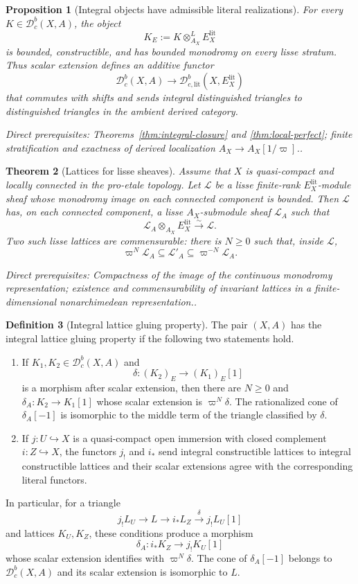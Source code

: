 \documentclass[10pt]{article}
\newtheorem{theorem}{Theorem}[section]
\newtheorem{proposition}[theorem]{Proposition}
\theoremstyle{definition}
\newtheorem{definition}[theorem]{Definition}
\newcommand{\Dbc}{\mathcal D^b_c}
\newcommand{\Dbclit}{\mathcal D^b_{c,\mathrm{lit}}}
\newcommand{\depends}[1]{\par\smallskip\noindent\textit{Direct prerequisites:} #1.}
\begin{document}
\begin{proposition}[Integral objects have admissible literal realizations]
\label{prop:integral-literal-landing}
For every $K\in\Dbc(X,A)$, the object
\[
 K_E:=K\otimes^L_{A_X}E_X^{\mathrm{lit}}
\]
is bounded, constructible, and has bounded monodromy on every lisse
stratum.  Thus scalar extension defines an additive functor
\[
 \Dbc(X,A)\longrightarrow\Dbclit(X,E_X^{\mathrm{lit}})
\]
that commutes with shifts and sends integral distinguished triangles to
distinguished triangles in the ambient derived category.
\depends{Theorems~\ref{thm:integral-closure} and
\ref{thm:local-perfect}; finite stratification and exactness of derived
localization $A_X\to A_X[1/\varpi]$.}
\end{proposition}

\begin{theorem}[Lattices for lisse sheaves]\label{thm:lisse-lattice}
Assume that $X$ is quasi-compact and locally connected in the pro-etale
topology.  Let $\mathcal L$ be a lisse finite-rank
$E_X^{\mathrm{lit}}$-module sheaf whose monodromy image on each connected
component is bounded.  Then $\mathcal L$ has, on each connected component, a lisse
$A_X$-submodule sheaf $\mathcal L_A$ such that
\[
 \mathcal L_A\otimes_{A_X}E_X^{\mathrm{lit}}
 \xrightarrow{\sim}\mathcal L.
\]
Two such lisse lattices are commensurable: there is $N\geq0$ such that,
inside $\mathcal L$,
\[
 \varpi^N\mathcal L_A\subseteq\mathcal L'_A
 \subseteq\varpi^{-N}\mathcal L_A.
\]
\depends{Compactness of the image of the continuous monodromy
representation; existence and commensurability of invariant lattices in a
finite-dimensional nonarchimedean representation.}
\end{theorem}

\begin{definition}[Integral lattice gluing property]
\label{def:lattice-gluing}
The pair $(X,A)$ has the integral lattice gluing property if the following
two statements hold.
\begin{enumerate}
\item If $K_1,K_2\in\Dbc(X,A)$ and
\[
 \delta:(K_2)_E\longrightarrow(K_1)_E[1]
\]
is a morphism after scalar extension, then there are $N\geq0$ and
$\delta_A:K_2\to K_1[1]$ whose scalar extension is
$\varpi^N\delta$.  The rationalized cone of $\delta_A[-1]$ is isomorphic to
the middle term of the triangle classified by $\delta$.
\item If $j:U\hookrightarrow X$ is a quasi-compact open immersion with
closed complement $i:Z\hookrightarrow X$, the functors $j_!$ and $i_*$ send
integral constructible lattices to integral constructible lattices and
their scalar extensions agree with the corresponding literal functors.
\end{enumerate}
In particular, for a triangle
\[
 j_!L_U\longrightarrow L\longrightarrow i_*L_Z
 \xrightarrow{\delta}j_!L_U[1]
\]
and lattices $K_U,K_Z$, these conditions produce a morphism
\[
 \delta_A:i_*K_Z\longrightarrow j_!K_U[1]
\]
whose scalar extension identifies with $\varpi^N\delta$.  The cone of
$\delta_A[-1]$ belongs to $\Dbc(X,A)$ and its scalar extension is
isomorphic to $L$.
\end{definition}
\end{document}
